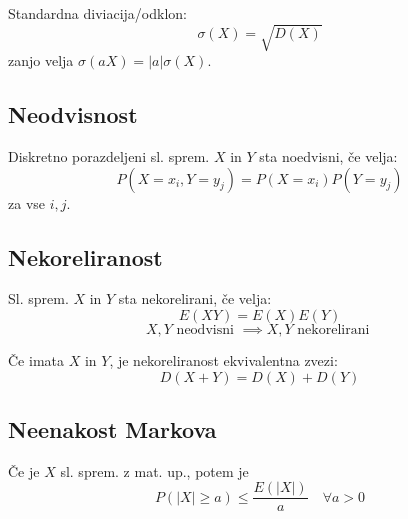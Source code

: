 \begin{multicols}{4}
Standardna diviacija/odklon:
\[ \sigma(X) = \sqrt{D(X)} \]
zanjo velja $\sigma (aX) = |a|\sigma(X)$.

\subsection{Neodvisnost}
Diskretno porazdeljeni sl. sprem. $X$ in $Y$ sta noedvisni, če velja:
\[ P(X = x_i, Y = y_j) = P(X = x_i)P(Y = y_j)\]
za vse $i, j$.

\subsection{Nekoreliranost}
Sl. sprem. $X$ in $Y$ sta nekorelirani, če velja:
\[ E(XY) = E(X)E(Y) \]
\[ X, Y \text{ neodvisni } \implies X,Y \text{ nekorelirani }\]

Če imata $X$ in $Y$, je nekoreliranost ekvivalentna zvezi:
\[ D(X+Y) = D(X) + D(Y)\]


\subsection{Neenakost Markova}
Če je $X$ sl. sprem. z mat. up., potem je
\[P(|X| \geq a) \leq \frac{E(|X|)}{a} \quad \forall a > 0\]

\end{multicols}
